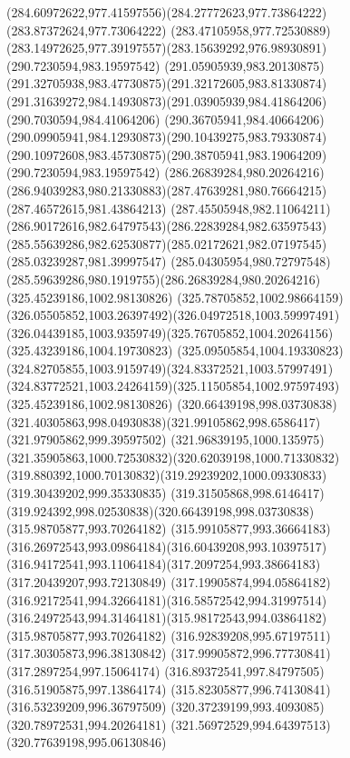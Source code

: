 {{	\curveto(284.60972622,977.41597556)(284.27772623,977.73864222)(283.87372624,977.73064222)
	\curveto(283.47105958,977.72530889)(283.14972625,977.39197557)(283.15639292,976.98930891)
	\moveto(290.7230594,983.19597542)
	\curveto(291.05905939,983.20130875)(291.32705938,983.47730875)(291.32172605,983.81330874)
	\curveto(291.31639272,984.14930873)(291.03905939,984.41864206)(290.7030594,984.41064206)
	\curveto(290.36705941,984.40664206)(290.09905941,984.12930873)(290.10439275,983.79330874)
	\curveto(290.10972608,983.45730875)(290.38705941,983.19064209)(290.7230594,983.19597542)
	\moveto(286.26839284,980.20264216)
	\curveto(286.94039283,980.21330883)(287.47639281,980.76664215)(287.46572615,981.43864213)
	\curveto(287.45505948,982.11064211)(286.90172616,982.64797543)(286.22839284,982.63597543)
	\curveto(285.55639286,982.62530877)(285.02172621,982.07197545)(285.03239287,981.39997547)
	\curveto(285.04305954,980.72797548)(285.59639286,980.1919755)(286.26839284,980.20264216)
	\moveto(325.45239186,1002.98130826)
	\curveto(325.78705852,1002.98664159)(326.05505852,1003.26397492)(326.04972518,1003.59997491)
	\curveto(326.04439185,1003.9359749)(325.76705852,1004.20264156)(325.43239186,1004.19730823)
	\curveto(325.09505854,1004.19330823)(324.82705855,1003.9159749)(324.83372521,1003.57997491)
	\curveto(324.83772521,1003.24264159)(325.11505854,1002.97597493)(325.45239186,1002.98130826)
	\moveto(320.66439198,998.03730838)
	\curveto(321.40305863,998.04930838)(321.99105862,998.6586417)(321.97905862,999.39597502)
	\curveto(321.96839195,1000.135975)(321.35905863,1000.72530832)(320.62039198,1000.71330832)
	\curveto(319.880392,1000.70130832)(319.29239202,1000.09330833)(319.30439202,999.35330835)
	\curveto(319.31505868,998.6146417)(319.924392,998.02530838)(320.66439198,998.03730838)
	\moveto(315.98705877,993.70264182)
	\curveto(315.99105877,993.36664183)(316.26972543,993.09864184)(316.60439208,993.10397517)
	\curveto(316.94172541,993.11064184)(317.2097254,993.38664183)(317.20439207,993.72130849)
	\curveto(317.19905874,994.05864182)(316.92172541,994.32664181)(316.58572542,994.31997514)
	\curveto(316.24972543,994.31464181)(315.98172543,994.03864182)(315.98705877,993.70264182)
	\moveto(316.92839208,995.67197511)
	\lineto(317.30305873,996.38130842)
	\lineto(317.99905872,996.77730841)
	\lineto(317.2897254,997.15064174)
	\lineto(316.89372541,997.84797505)
	\lineto(316.51905875,997.13864174)
	\lineto(315.82305877,996.74130841)
	\lineto(316.53239209,996.36797509)
	\closepath
	\moveto(320.37239199,993.4093085)
	\lineto(320.78972531,994.20264181)
	\lineto(321.56972529,994.64397513)
	\lineto(320.77639198,995.06130846)
}}
